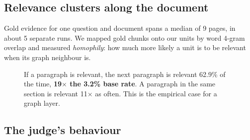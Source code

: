 \documentclass[10pt,a4paper]{article}
\begin{document}
\subsection{Relevance clusters along the document}
\label{sec:homophily}

Gold evidence for one question and document spans a median of 9 pages, in about 5 separate runs.
We mapped gold chunks onto our units by word 4-gram overlap and measured \emph{homophily}: how much more likely a unit is to be relevant when its graph neighbour is.

\begin{figure}[h]
\centering
{}
\caption{If a paragraph is relevant, the next paragraph is relevant 62.9\% of the time, \textbf{19$\times$ the 3.2\% base rate}. A paragraph in the same section is relevant 11$\times$ as often. This is the empirical case for a graph layer.}
\label{fig:homophily}
\end{figure}

\subsection{The judge's behaviour}
\label{sec:judge}
\end{document}

